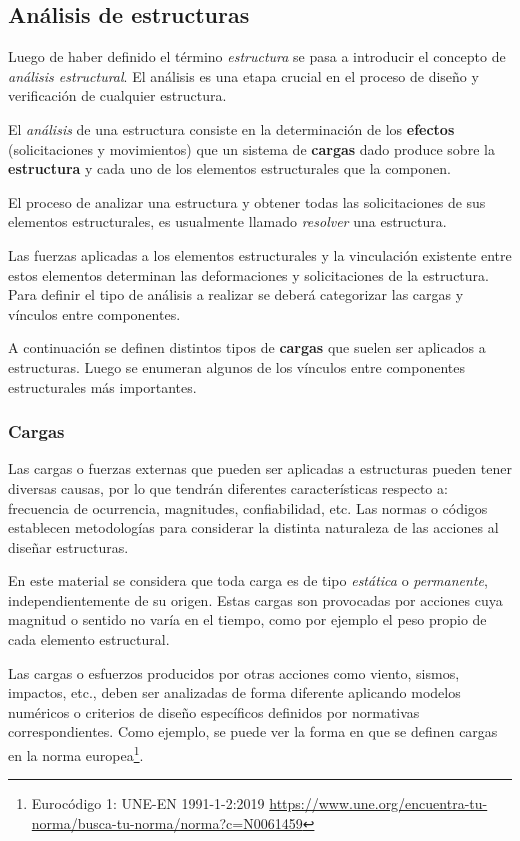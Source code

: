 \subsection{Análisis de estructuras}

Luego de haber definido el término \textit{estructura} se pasa a introducir el concepto de \textit{análisis estructural}. %
%
El análisis es una etapa crucial en el proceso de diseño y verificación de cualquier estructura.

{El \textit{análisis} de una estructura consiste en la determinación de los \textbf{efectos} (solicitaciones y movimientos) que un sistema de \textbf{cargas} dado produce sobre la \textbf{estructura} y cada uno de los elementos estructurales que la componen.}

El proceso de analizar una estructura y obtener todas las solicitaciones de sus elementos estructurales, es usualmente llamado \textit{resolver} una estructura. %

Las fuerzas aplicadas a los elementos estructurales y la vinculación existente entre estos elementos determinan las deformaciones y solicitaciones de la estructura. %
%
Para definir el tipo de análisis a realizar se deberá categorizar las cargas y vínculos entre componentes. %

A continuación se definen distintos tipos de \textbf{cargas} que suelen ser aplicados a estructuras. Luego se enumeran algunos de los vínculos entre componentes estructurales más importantes.

\subsubsection{Cargas}

Las cargas o fuerzas externas que pueden ser aplicadas a estructuras pueden tener diversas causas, por lo que tendrán diferentes características respecto a: frecuencia de ocurrencia, magnitudes, confiabilidad, etc. Las normas o códigos establecen metodologías para considerar la distinta naturaleza de las acciones al diseñar estructuras.

En este material se considera que toda carga es de tipo \textit{estática} o \textit{permanente}, independientemente de su origen. %
%
Estas cargas son provocadas por acciones cuya magnitud o sentido no varía en el tiempo, como por ejemplo el peso propio de cada elemento estructural. %

Las cargas o esfuerzos producidos por otras acciones como viento, sismos, impactos, etc., deben ser analizadas de forma diferente aplicando modelos numéricos o criterios de diseño específicos definidos por normativas correspondientes. Como ejemplo, se puede ver la  forma en que se definen cargas en la norma europea\footnote{Eurocódigo 1: UNE-EN 1991-1-2:2019 \href{https://www.une.org/encuentra-tu-norma/busca-tu-norma/norma?c=N0061459}{https://www.une.org/encuentra-tu-norma/busca-tu-norma/norma?c=N0061459}}.

